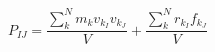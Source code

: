 \documentclass[12pt]{article}
\begin{document}
$$
   P_{IJ} = \frac{\sum_{k}^{N} m_k v_{k_I} v_{k_J}}{V} + 
   \frac{\sum_{k}^{N} r_{k_I} f_{k_J}}{V}
$$
\end{document}
